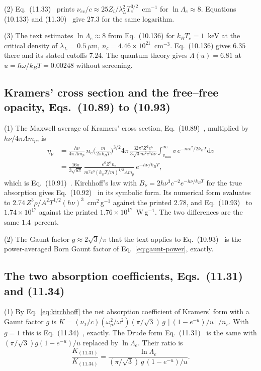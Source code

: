 \documentclass[11pt]{article}
\numberwithin{equation}{section}
\newcommand{\nuT}{\nu_T}
\newcommand{\dd}{\mathrm d}
\newcommand{\kB}{k_B}
\begin{document}
{\noindent}(2) Eq.~(11.33)~\cite{Atzeni2004} prints
$\nu_{ec}/c\approx25Z_i/\lambda_L^2T_e^{3/2}$~cm$^{-1}$ for $\ln\Lambda_e\approx8$.
Equations (10.133) and (11.30)~\cite{Atzeni2004} give $27.3$ for the same
logarithm.

{\noindent}(3) The text estimates $\ln\Lambda_e\approx8$ from Eq.~(10.136) for
$\kB T_e=1$~keV at the critical density of $\lambda_L=0.5~\mu$m,
$n_c=4.46\times10^{21}$~cm$^{-3}$. Eq.~(10.136) gives $6.35$ there and its stated
cutoffs $7.24$. The quantum theory gives $\Lambda(u)=6.81$ at
$u=\hbar\omega/\kB T=0.00248$ without screening.

\subsection{Kramers' cross section and the free--free opacity, Eqs.~(10.89) to (10.93)}
{\noindent}(1) The Maxwell average of Kramers' cross section,
Eq.~(10.89)~\cite{Atzeni2004}, multiplied by $h\nu/4\pi Am_p$, is
\begin{equation}
\begin{aligned}
\eta_\nu&=\frac{h\nu}{4\pi Am_p}\,n_e\Big(\frac{m}{2\pi\kB T}\Big)^{3/2}4\pi\,
\frac{32\pi^2Z^2e^6}{3\sqrt3m^2c^3h\nu}\int_{v_{\min}}^\infty v\,e^{-mv^2/2\kB T}\dd v\\
&=\frac{16\pi}{3\sqrt{6\pi}}\,\frac{e^6Z^2n_e}{m^2c^3(\kB T/m)^{1/2}Am_p}\,e^{-h\nu/\kB T},
\end{aligned}
\end{equation}
which is Eq.~(10.91)~\cite{Atzeni2004}. Kirchhoff's law with
$B_\nu=2h\nu^3c^{-2}e^{-h\nu/\kB T}$ for the true absorption gives
Eq.~(10.92)~\cite{Atzeni2004} in its symbolic form. Its numerical form
evaluates to $2.74\,Z^3\rho/A^2T^{1/2}(h\nu)^3$~cm$^2$\,g$^{-1}$ against the
printed $2.78$, and Eq.~(10.93)~\cite{Atzeni2004} to $1.74\times10^{17}$ against
the printed $1.76\times10^{17}$~W\,g$^{-1}$. The two differences are the same
$1.4$~percent.

{\noindent}(2) The Gaunt factor $g\approx2\sqrt3/\pi$ that the text applies to
Eq.~(10.93)~\cite{Atzeni2004} is the power-averaged Born Gaunt factor of
Eq.~\eqref{eq:gaunt-power}, exactly.

\subsection{The two absorption coefficients, Eqs.~(11.31) and (11.34)}
\label{app:atzeni-ff}
{\noindent}(1) By Eq.~\eqref{eq:kirchhoff} the net absorption coefficient of
Kramers' form with a Gaunt factor $g$ is
$K=(\nuT/c)(\omega_p^2/\omega^2)(\pi/\sqrt3)\,g\,[(1-e^{-u})/u]/n_r$. With $g=1$ this is
Eq.~(11.34)~\cite{Atzeni2004}, exactly. The Drude form
Eq.~(11.31)~\cite{Atzeni2004} is the same with $(\pi/\sqrt3)g(1-e^{-u})/u$
replaced by $\ln\Lambda_e$. Their ratio is
\begin{equation}
\frac{K_{(11.31)}}{K_{(11.34)}}=\frac{\ln\Lambda_e}{(\pi/\sqrt3)\,g\,(1-e^{-u})/u}.
\end{equation}
\end{document}
